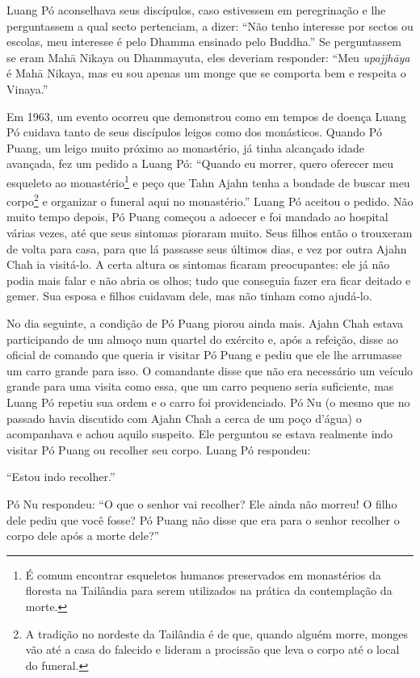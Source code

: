 Luang Pó aconselhava seus discípulos, caso estivessem em peregrinação e
lhe perguntassem a qual secto pertenciam, a dizer: ``Não tenho interesse
por sectos ou escolas, meu interesse é pelo Dhamma ensinado pelo
Buddha.'' Se perguntassem se eram Mahā Nikaya ou Dhammayuta, eles
deveriam responder: ``Meu \emph{upajjhāya} é Mahā Nikaya, mas eu sou
apenas um monge que se comporta bem e respeita o Vinaya.''

Em 1963, um evento ocorreu que demonstrou como em tempos de doença Luang
Pó cuidava tanto de seus discípulos leigos como dos monásticos. Quando
Pó Puang, um leigo muito próximo ao monastério, já tinha alcançado idade
avançada, fez um pedido a Luang Pó: ``Quando eu morrer, quero oferecer
meu esqueleto ao monastério\footnote{É comum encontrar esqueletos
  humanos preservados em monastérios da floresta na Tailândia para serem
  utilizados na prática da contemplação da morte.} e peço que Tahn Ajahn
tenha a bondade de buscar meu corpo\footnote{A tradição no nordeste da
  Tailândia é de que, quando alguém morre, monges vão até a casa do
  falecido e lideram a procissão que leva o corpo até o local do
  funeral.} e organizar o funeral aqui no monastério.'' Luang Pó aceitou
o pedido. Não muito tempo depois, Pó Puang começou a adoecer e foi
mandado ao hospital várias vezes, até que seus sintomas pioraram muito.
Seus filhos então o trouxeram de volta para casa, para que lá passasse
seus últimos dias, e vez por outra Ajahn Chah ia visitá-lo. A certa
altura os sintomas ficaram preocupantes: ele já não podia mais falar e
não abria os olhos; tudo que conseguia fazer era ficar deitado e gemer.
Sua esposa e filhos cuidavam dele, mas não tinham como ajudá-lo.

No dia seguinte, a condição de Pó Puang piorou ainda mais. Ajahn Chah
estava participando de um almoço num quartel do exército e, após a
refeição, disse ao oficial de comando que queria ir visitar Pó Puang e
pediu que ele lhe arrumasse um carro grande para isso. O comandante
disse que não era necessário um veículo grande para uma visita como
essa, que um carro pequeno seria suficiente, mas Luang Pó repetiu sua
ordem e o carro foi providenciado. Pó Nu (o mesmo que no passado havia
discutido com Ajahn Chah a cerca de um poço d'água) o acompanhava e
achou aquilo suspeito. Ele perguntou se estava realmente indo visitar Pó
Puang ou recolher seu corpo. Luang Pó respondeu:

``Estou indo recolher.''

Pó Nu respondeu: ``O que o senhor vai recolher? Ele ainda não morreu! O
filho dele pediu que você fosse? Pó Puang não disse que era para o
senhor recolher o corpo dele após a morte dele?''


